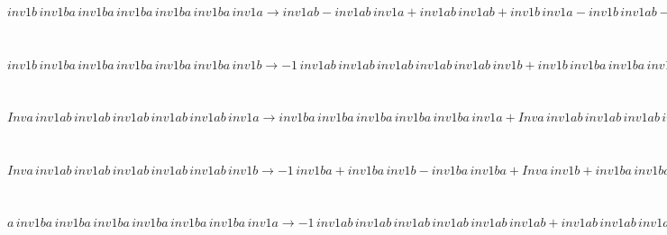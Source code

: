 \documentclass[rep10,leqno]{report}
\begin{document}
\begin{minipage}{6in}
$
inv1b\,
 inv1ba\,
 inv1ba\,
 inv1ba\,
 inv1ba\,
 inv1ba\,
 inv1a\rightarrow inv1ab - inv1ab\,
 inv1a + inv1ab\,
 inv1ab + inv1b\,
 inv1a - inv1b\,
 inv1ab - inv1ab\,
 inv1ab\,
 inv1a + inv1ab\,
 inv1ab\,
 inv1ab + inv1b\,
 inv1ab\,
 inv1a - inv1b\,
 inv1ab\,
 inv1ab - inv1ab\,
 inv1ab\,
 inv1ab\,
 inv1a + inv1ab\,
 inv1ab\,
 inv1ab\,
 inv1ab + inv1b\,
 inv1ab\,
 inv1ab\,
 inv1a - inv1b\,
 inv1ab\,
 inv1ab\,
 inv1ab - inv1ab\,
 inv1ab\,
 inv1ab\,
 inv1ab\,
 inv1a + inv1ab\,
 inv1ab\,
 inv1ab\,
 inv1ab\,
 inv1ab + inv1b\,
 inv1ab\,
 inv1ab\,
 inv1ab\,
 inv1a - inv1b\,
 inv1ab\,
 inv1ab\,
 inv1ab\,
 inv1ab - inv1ab\,
 inv1ab\,
 inv1ab\,
 inv1ab\,
 inv1ab\,
 inv1a + inv1b\,
 inv1ab\,
 inv1ab\,
 inv1ab\,
 inv1ab\,
 inv1a - inv1b\,
 inv1ab\,
 inv1ab\,
 inv1ab\,
 inv1ab\,
 inv1ab + inv1b\,
 inv1ab\,
 inv1ab\,
 inv1ab\,
 inv1ab\,
 inv1ab\,
 inv1a
$
\end{minipage}\medskip \\
\begin{minipage}{6in}
$
inv1b\,
 inv1ba\,
 inv1ba\,
 inv1ba\,
 inv1ba\,
 inv1ba\,
 inv1b\rightarrow -1\,
 inv1ab\,
 inv1ab\,
 inv1ab\,
 inv1ab\,
 inv1ab\,
 inv1b + inv1b\,
 inv1ba\,
 inv1ba\,
 inv1ba\,
 inv1ba\,
 inv1ba + inv1b\,
 inv1ab\,
 inv1ab\,
 inv1ab\,
 inv1ab\,
 inv1ab\,
 inv1b
$
\end{minipage}\medskip \\
\begin{minipage}{6in}
$
Inva\,
 inv1ab\,
 inv1ab\,
 inv1ab\,
 inv1ab\,
 inv1ab\,
 inv1a\rightarrow inv1ba\,
 inv1ba\,
 inv1ba\,
 inv1ba\,
 inv1ba\,
 inv1a + Inva\,
 inv1ab\,
 inv1ab\,
 inv1ab\,
 inv1ab\,
 inv1ab
$
\end{minipage}\medskip \\
\begin{minipage}{6in}
$
Inva\,
 inv1ab\,
 inv1ab\,
 inv1ab\,
 inv1ab\,
 inv1ab\,
 inv1b\rightarrow -1\,
 inv1ba + inv1ba\,
 inv1b - inv1ba\,
 inv1ba + Inva\,
 inv1b + inv1ba\,
 inv1ba\,
 inv1b - inv1ba\,
 inv1ba\,
 inv1ba + inv1ba\,
 inv1ba\,
 inv1ba\,
 inv1b - inv1ba\,
 inv1ba\,
 inv1ba\,
 inv1ba + inv1ba\,
 inv1ba\,
 inv1ba\,
 inv1ba\,
 inv1b - inv1ba\,
 inv1ba\,
 inv1ba\,
 inv1ba\,
 inv1ba + inv1ba\,
 inv1ba\,
 inv1ba\,
 inv1ba\,
 inv1ba\,
 inv1b
$
\end{minipage}\medskip \\
\begin{minipage}{6in}
$
a\,
 inv1ba\,
 inv1ba\,
 inv1ba\,
 inv1ba\,
 inv1ba\,
 inv1ba\,
 inv1a\rightarrow -1\,
 inv1ab\,
 inv1ab\,
 inv1ab\,
 inv1ab\,
 inv1ab\,
 inv1ab + inv1ab\,
 inv1ab\,
 inv1ab\,
 inv1ab\,
 inv1ab\,
 inv1ab\,
 inv1a
$
\end{minipage}\medskip \\
\end{document}
